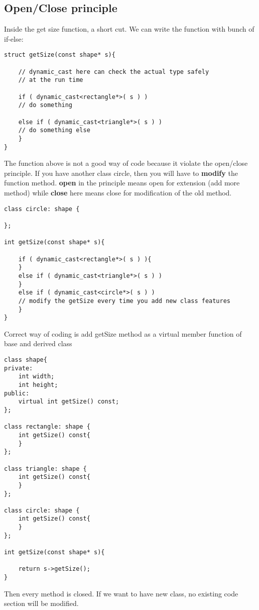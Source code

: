 \documentclass[11pt, oneside]{article}   	%
\begin{document}
\subsection{Open/Close principle}
Inside the get size function, a short cut. We can write the function with bunch of if-else:
\begin{lstlisting}
struct getSize(const shape* s){

	// dynamic_cast here can check the actual type safely
	// at the run time

	if ( dynamic_cast<rectangle*>( s ) )
   	// do something

	else if ( dynamic_cast<triangle*>( s ) )
   	// do something else
	}
}
\end{lstlisting}
The function above is not a good way of code because it violate the open/close principle. If you have another class circle, then you will
have to \textbf{modify} the function method. \textbf{open} in the principle means open for extension (add more method) while \textbf{close} here means
close for modification of the old method.
\begin{lstlisting}
class circle: shape {

};

int getSize(const shape* s){

	if ( dynamic_cast<rectangle*>( s ) ){
	}
	else if ( dynamic_cast<triangle*>( s ) )
	}
	else if ( dynamic_cast<circle*>( s ) )
   	// modify the getSize every time you add new class features
	}
}
\end{lstlisting}
Correct way of coding is add getSize method as a virtual member function of base and derived class
\begin{lstlisting}
class shape{
private:
	int width;
	int height;
public:
	virtual int getSize() const;
};

class rectangle: shape {
	int getSize() const{
	}
};

class triangle: shape {
	int getSize() const{
	}
};

class circle: shape {
	int getSize() const{
	}
};

int getSize(const shape* s){

	return s->getSize();
}
\end{lstlisting}
Then every method is closed. If we want to have new class, no existing code section will be modified.
\end{document}
